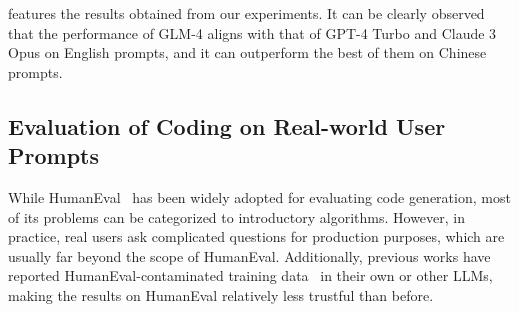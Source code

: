 \begin{table}[!ht]
    \centering
    \renewcommand{\arraystretch}{1.5}
    \caption{GLM-4 performance on LongBench-Chat~\cite{bai2023longbench}.}
    \label{tab:longbench}
\end{table}

 features the results obtained from our experiments. 
It can be clearly observed that the performance of GLM-4 aligns with that of GPT-4 Turbo and Claude 3 Opus on English prompts, and it can  outperform the best of them on Chinese prompts. 




\subsection{Evaluation of Coding on Real-world User Prompts}

While HumanEval~\cite{Humaneval:abs-2107-03374} has been widely adopted for evaluating code generation, most of its problems can be categorized to introductory algorithms.
However, in practice, real users ask complicated questions for production purposes, which are usually far beyond the scope of HumanEval.
Additionally, previous works have reported HumanEval-contaminated training data~\cite{openai2023gpt,li2023textbooks,yang2023rethinking} in their own or other LLMs, making the results on HumanEval relatively less trustful than before.

